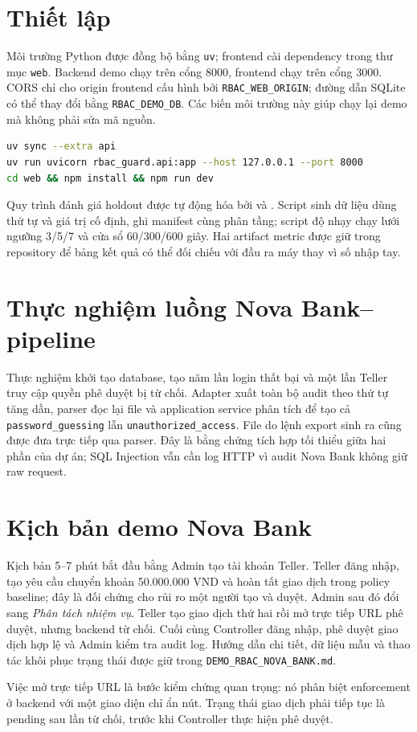 \section{Thiết lập}

Môi trường Python được đồng bộ bằng \texttt{uv}; frontend cài dependency trong
thư mục \texttt{web}. Backend demo chạy trên cổng 8000, frontend chạy trên cổng
3000. CORS chỉ cho origin frontend cấu hình bởi \texttt{RBAC\_WEB\_ORIGIN};
đường dẫn SQLite có thể thay đổi bằng \texttt{RBAC\_DEMO\_DB}. Các biến môi
trường này giúp chạy lại demo mà không phải sửa mã nguồn.

\begin{lstlisting}[language=bash]
uv sync --extra api
uv run uvicorn rbac_guard.api:app --host 127.0.0.1 --port 8000
cd web && npm install && npm run dev
\end{lstlisting}

Quy trình đánh giá holdout được tự động hóa bởi
 và
. Script sinh dữ liệu dùng thứ tự
và giá trị cố định, ghi manifest cùng phân tầng; script độ nhạy chạy lưới ngưỡng
3/5/7 và cửa sổ 60/300/600 giây. Hai artifact metric được giữ trong repository
để bảng kết quả có thể đối chiếu với đầu ra máy thay vì số nhập tay.

\section{Thực nghiệm luồng Nova Bank--pipeline}

Thực nghiệm khởi tạo database, tạo năm lần login thất bại và một lần Teller
truy cập quyền phê duyệt bị từ chối. Adapter xuất toàn bộ audit theo thứ tự tăng
dần, parser đọc lại file và application service phân tích để tạo cả
\texttt{password\_guessing} lẫn \texttt{unauthorized\_access}. File do lệnh
export sinh ra cũng được đưa trực tiếp qua parser. Đây là bằng chứng tích hợp
tối thiểu giữa hai phần của dự án; SQL Injection vẫn cần log HTTP vì audit Nova
Bank không giữ raw request.

\section{Kịch bản demo Nova Bank}

Kịch bản 5--7 phút bắt đầu bằng Admin tạo tài khoản Teller. Teller đăng nhập,
tạo yêu cầu chuyển khoản 50.000.000 VND và hoàn tất giao dịch trong policy
baseline; đây là đối chứng cho rủi ro một người tạo và duyệt. Admin sau đó đổi
sang \emph{Phân tách nhiệm vụ}. Teller tạo giao dịch thứ hai rồi mở trực tiếp
URL phê duyệt, nhưng backend từ chối. Cuối cùng Controller đăng nhập, phê duyệt
giao dịch hợp lệ và Admin kiểm tra audit log. Hướng dẫn chi tiết, dữ liệu mẫu
và thao tác khôi phục trạng thái được giữ trong \texttt{DEMO\_RBAC\_NOVA\_BANK.md}.

Việc mở trực tiếp URL là bước kiểm chứng quan trọng: nó phân biệt enforcement
ở backend với một giao diện chỉ ẩn nút. Trạng thái giao dịch phải tiếp tục là
pending sau lần từ chối, trước khi Controller thực hiện phê duyệt.
